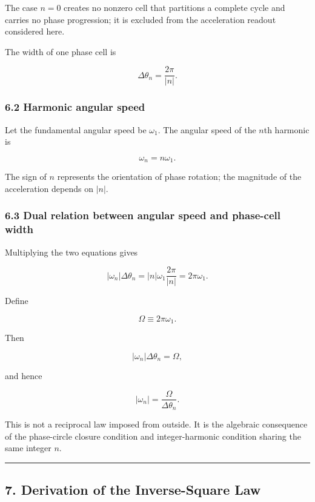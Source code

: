 \documentclass[
  a4paper,
]{article}
\begin{document}
The case \(n=0\) creates no nonzero cell that partitions a complete
cycle and carries no phase progression; it is excluded from the
acceleration readout considered here.

The width of one phase cell is

\[
\boxed{
\Delta\theta_n
=\frac{2\pi}{|n|}
}.
\]

\subsubsection{6.2 Harmonic angular speed}\label{harmonic-angular-speed}

Let the fundamental angular speed be \(\omega_1\). The angular speed of
the \(n\)th harmonic is

\[
\boxed{
\omega_n=n\omega_1
}.
\]

The sign of \(n\) represents the orientation of phase rotation; the
magnitude of the acceleration depends on \(|n|\).

\subsubsection{6.3 Dual relation between angular speed and phase-cell
width}\label{dual-relation-between-angular-speed-and-phase-cell-width}

Multiplying the two equations gives

\[
|\omega_n|\Delta\theta_n
=|n|\omega_1\frac{2\pi}{|n|}
=2\pi\omega_1.
\]

Define

\[
\Omega\equiv2\pi\omega_1.
\]

Then

\[
\boxed{
|\omega_n|\Delta\theta_n=\Omega
},
\]

and hence

\[
\boxed{
|\omega_n|
=\frac{\Omega}{\Delta\theta_n}
}.
\]

This is not a reciprocal law imposed from outside. It is the algebraic
consequence of the phase-circle closure condition and integer-harmonic
condition sharing the same integer \(n\).

\begin{center}\rule{0.5\linewidth}{0.5pt}\end{center}

\subsection{7. Derivation of the Inverse-Square
Law}\label{derivation-of-the-inverse-square-law}
\end{document}
